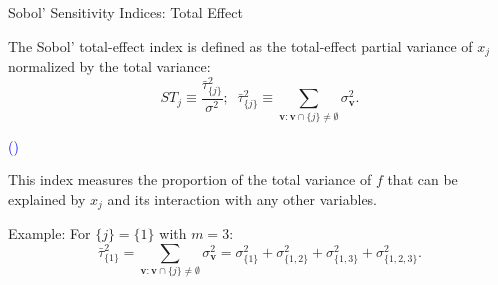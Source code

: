 \documentclass[english,aspectratio=169]{beamer}
\renewcommand{\emph}[1]{\textcolor[HTML]{006d2c}{\fontseries{sb}\selectfont #1}}
\begin{document}

\begin{frame}[fragile]{Sobol' Sensitivity Indices: Total Effect}
\small

The \emph{Sobol' total-effect index} is defined as the \emph{total-effect partial variance}
of $x_j$ normalized by the total variance:
\begin{equation*}
  ST_j \equiv \frac{\bar{\tau}_{\{j\}}^2}{\sigma^2};\;\; \bar{\tau}_{\{j\}}^2 \equiv \sum_{\bm{v}: \bm{v} \cap \{j\} \neq \emptyset} \sigma^2_{\bm{v}}.
\end{equation*}
{\hfill \raggedright \tiny \textcolor{blue}{(\cite{Homma1996})}}

\vspace{1.0em}

\begin{exampleblock}{}
\centering
This index measures the proportion of the total variance of $f$
that can be explained by $x_j$ \emph{and} its interaction with any other variables.
\end{exampleblock}

\vspace{0.5em}

\emph{Example}: For $\{ j \} = \{ 1 \}$ with $m = 3$:
\begin{equation*}
  \bar{\tau}_{\{ 1 \}}^2 = \sum_{\bm{v}: \bm{v} \cap \{ j \} \neq \emptyset} \sigma^2_{\bm{v}} = \sigma^2_{\{1\}} + \sigma^2_{\{1, 2\}} + \sigma^2_{\{1, 3\}} + \sigma^2_{\{1, 2, 3\}}.
\end{equation*}

\end{frame}
\end{document}
